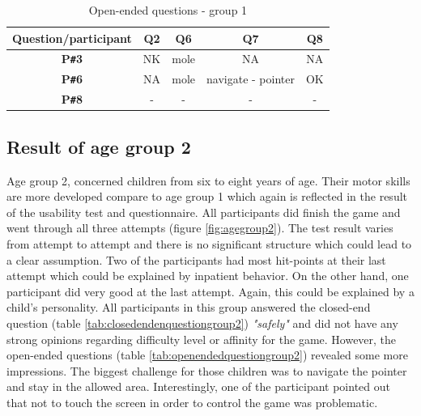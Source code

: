 \begin{table}[!ht]
    \centering
    \begin{tabular}{c|c|c|c|c}
    \hline
    \multicolumn{1}{|c|}{\textbf{Question/participant}} &
    \multicolumn{1}{c|}{\textbf{Q2}} &
    \multicolumn{1}{c|}{\textbf{Q6}} &
    \multicolumn{1}{c|}{\textbf{Q7}} &
    \multicolumn{1}{c|}{\textbf{Q8}} \\ \hline
    \multicolumn{1}{|c|}{\textbf{P\texttt{\#}3}} &
    \multicolumn{1}{c|}{NK} &
    \multicolumn{1}{c|}{mole} &
    \multicolumn{1}{c|}{NA} &
    \multicolumn{1}{c|}{NA} \\ \hline
    \multicolumn{1}{|c|}{\textbf{P\texttt{\#}6}} &
    \multicolumn{1}{c|}{NA} &
    \multicolumn{1}{c|}{mole} &
    \multicolumn{1}{c|}{navigate - pointer} &
    \multicolumn{1}{c|}{OK} \\ \hline
    \multicolumn{1}{|c|}{\textbf{P\texttt{\#}8}} &
    \multicolumn{1}{c|}{-} &
    \multicolumn{1}{c|}{-} &
    \multicolumn{1}{c|}{-} &
    \multicolumn{1}{c|}{-} \\ \hline
    \end{tabular}
    \caption{Open-ended questions - group 1}
    \label{tab:openendedquestiongroup1}
\end{table}

\newpage

\subsection{Result of age group 2}
Age group 2, concerned children from six to eight years of age. Their motor skills are more developed compare to age group 1 which again is reflected in the result of the usability test and questionnaire. All participants did finish the game and went through all three attempts (figure \ref{fig:agegroup2}). The test result varies from attempt to attempt and there is no significant structure which could lead to a clear assumption. Two of the participants had most hit-points at their last attempt which could be explained by inpatient behavior. On the other hand, one participant did very good at the last attempt. Again, this could be explained by a child's personality.
All participants in this group answered the closed-end question (table \ref{tab:closedendenquestiongroup2}) \textit{"safely"} and did not have any strong opinions regarding difficulty level or affinity for the game. However, the open-ended questions (table \ref{tab:openendedquestiongroup2}) revealed some more impressions. The biggest challenge for those children was to navigate the pointer and stay in the allowed area. Interestingly, one of the participant pointed out that not to touch the screen in order to control the game was problematic. 



